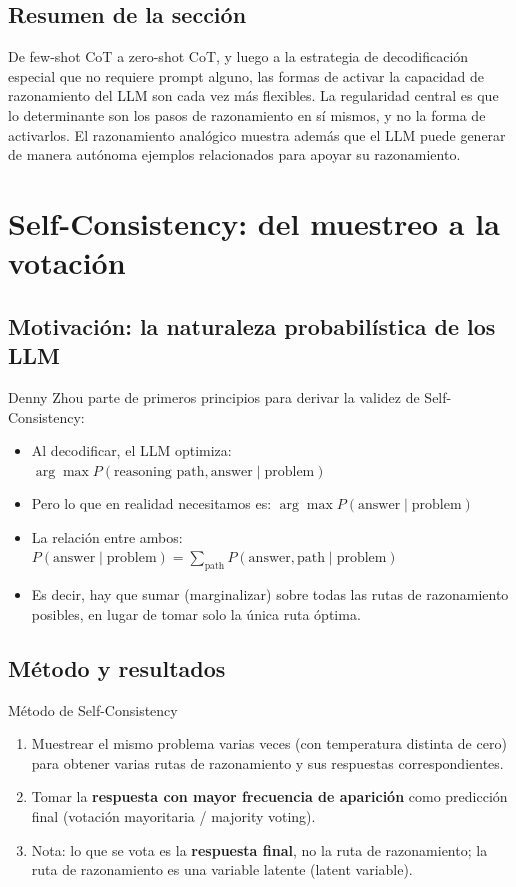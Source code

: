 \documentclass[a4paper]{article}
\begin{document}
\subsection{Resumen de la sección}

De few-shot CoT a zero-shot CoT, y luego a la estrategia de decodificación especial que no requiere prompt alguno, las formas de activar la capacidad de razonamiento del LLM son cada vez más flexibles. La regularidad central es que lo determinante son los pasos de razonamiento en sí mismos, y no la forma de activarlos. El razonamiento analógico muestra además que el LLM puede generar de manera autónoma ejemplos relacionados para apoyar su razonamiento.
\section{Self-Consistency: del muestreo a la votación}

\subsection{Motivación: la naturaleza probabilística de los LLM}

Denny Zhou parte de primeros principios para derivar la validez de Self-Consistency:

\begin{itemize}
    \item Al decodificar, el LLM optimiza: $\arg\max P(\text{reasoning path}, \text{answer} \mid \text{problem})$
    \item Pero lo que en realidad necesitamos es: $\arg\max P(\text{answer} \mid \text{problem})$
    \item La relación entre ambos: $P(\text{answer} \mid \text{problem}) = \sum_{\text{path}} P(\text{answer}, \text{path} \mid \text{problem})$
    \item Es decir, hay que sumar (marginalizar) sobre todas las rutas de razonamiento posibles, en lugar de tomar solo la única ruta óptima.
\end{itemize}

\subsection{Método y resultados}

\begin{importantbox}{Método de Self-Consistency}
\begin{enumerate}
    \item Muestrear el mismo problema varias veces (con temperatura distinta de cero) para obtener varias rutas de razonamiento y sus respuestas correspondientes.
    \item Tomar la \textbf{respuesta con mayor frecuencia de aparición} como predicción final (votación mayoritaria / majority voting).
    \item Nota: lo que se vota es la \textbf{respuesta final}, no la ruta de razonamiento; la ruta de razonamiento es una variable latente (latent variable).
\end{enumerate}
\end{importantbox}
\end{document}
